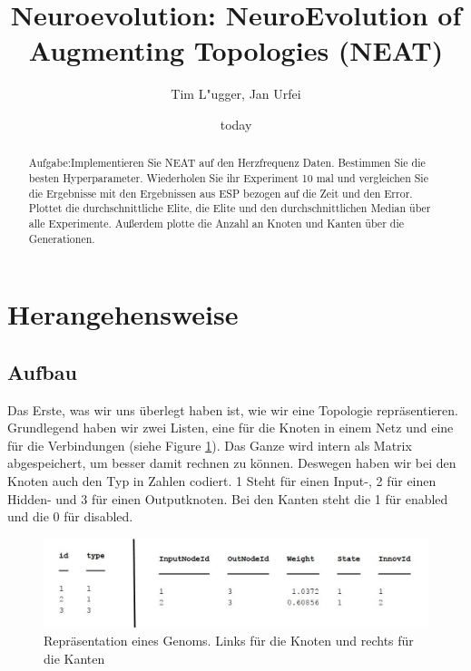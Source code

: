 \documentclass{hbrs-ecta-report}
\begin{document}

\title{Neuroevolution: NeuroEvolution of Augmenting Topologies (NEAT)}
\subtitle{}

\author{
\alignauthor
Tim L"ugger, Jan Urfei
}

\date{today}
\maketitle
\begin{abstract}
Aufgabe:Implementieren Sie NEAT auf den Herzfrequenz Daten. Bestimmen Sie die besten Hyperparameter. Wiederholen Sie ihr Experiment 10 mal und vergleichen Sie die Ergebnisse mit den Ergebnissen aus ESP bezogen auf die Zeit und den Error.
Plottet die durchschnittliche Elite, die Elite und den durchschnittlichen Median über alle Experimente.
Außerdem plotte die Anzahl an Knoten und Kanten über die Generationen.
\end{abstract}

\section{Herangehensweise}
\subsection{Aufbau}
 Das Erste, was wir uns überlegt haben ist, wie wir eine Topologie repräsentieren. Grundlegend haben wir zwei Listen, eine für die Knoten in einem Netz und eine für die Verbindungen (siehe Figure \ref{fig:Genomtabelle}). Das Ganze wird intern als Matrix abgespeichert, um besser damit rechnen zu können. Deswegen haben wir bei den Knoten auch den Typ in Zahlen codiert. 1 Steht für einen Input-, 2 für einen Hidden- und 3 für einen Outputknoten. Bei den Kanten steht die 1 für enabled und die 0 für disabled.
 \begin{figure}[h!]
 	\includegraphics[width=\linewidth]{img/Genomtabelle}
 	\caption{Repräsentation eines Genoms. Links für die Knoten und rechts für die Kanten}
 	\label{fig:Genomtabelle}
 \end{figure}
\end{document}
